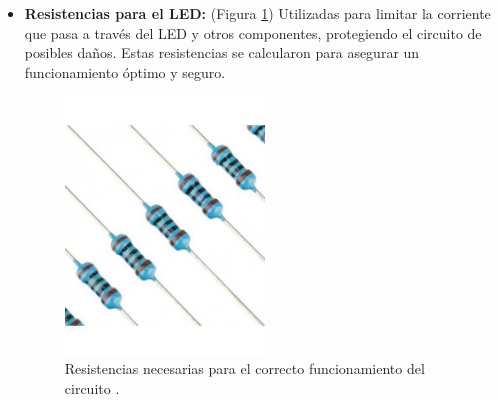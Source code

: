 \begin{itemize}
\item \textbf{Resistencias para el LED:} (Figura \ref{fig:Resistencias
})
Utilizadas para limitar la corriente que pasa a través del LED y otros componentes, protegiendo el circuito de posibles daños. Estas resistencias se calcularon para asegurar un funcionamiento óptimo y seguro.

\begin{figure}[h]
\centering
\includegraphics[width=0.5\textwidth]{img/resistencia.jpg}
\caption{Resistencias necesarias para el correcto funcionamiento del circuito \cite{Resistencia}.}
\label{fig:Resistencias
}
\end{figure}
\end{itemize}































